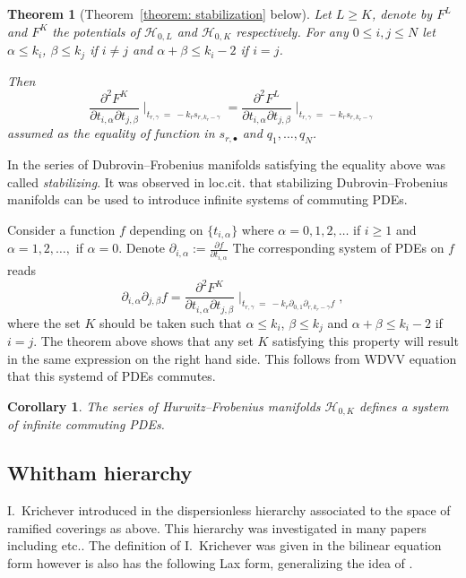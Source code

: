 \documentclass[12pt,a4paper]{amsart}
\def\H{{\mathcal H}}
\newcommand{\p}{{\partial}}
\newcommand{\<}{\left<}
\renewcommand{\>}{\right>}
\newtheorem*{theorem*}{Theorem}
\newtheorem*{corollary*}{Corollary}
\numberwithin{equation}{section}
\begin{document}
\begin{theorem*}[Theorem~\ref{theorem: stabilization} below]
    Let $L \ge K$, denote by $F^L$ and $F^K$ the potentials of $\H_{0,L}$ and $\H_{0,K}$ respectively. For any $0 \le i,j \le N$ let $\alpha \le k_i$, $\beta \le k_j$ if $i \neq j$ and $\alpha+\beta \le k_i-2$ if $i=j$.

    Then
    \[
        \frac{\p^2 F^{K}}{\p t_{i,\alpha} \p t_{j,\beta}} \mid_{t_{r,\gamma} \ = \ - k_r s_{r,k_r-\gamma}}
        =
        \frac{\p^2 F^{L}}{\p t_{i,\alpha} \p t_{j,\beta}} \mid_{t_{r,\gamma} \ = \ - k_r s_{r,k_r-\gamma}}
    \]
    assumed as the equality of function in $s_{r,\bullet}$ and $q_1,\dots,q_N$.
\end{theorem*}
In \cite{BDbN} the series of Dubrovin--Frobenius manifolds satisfying the equality above was called \textit{stabilizing}. It was observed in loc.cit. that stabilizing Dubrovin--Frobenius manifolds can be used to introduce infinite systems of commuting PDEs.

Consider a function $f$ depending on $\lbrace t_{i,\alpha} \rbrace$ where $\alpha = 0,1,2,\dots$  if $i \ge 1$ and $\alpha = 1,2,\dots,$ if $\alpha = 0$. Denote $\p_{i,\alpha} := \frac{\p f}{\p t_{i,\alpha}} $ The corresponding system of PDEs on $f$ reads
\begin{equation}\label{eq: BDbN form}
     \p_{i,\alpha} \p_{j,\beta} f = \frac{\p^2 F^K}{\p t_{i,\alpha} \p t_{j,\beta}} \mid_{t_{r,\gamma} \ = \ -k_r \p_{0,1} \p_{r,k_r-\gamma} f },
\end{equation}
where the set $K$ should be taken such that $\alpha \le k_i$, $\beta \le k_j$ and $\alpha+\beta \le k_i-2$ if $i=j$. The theorem above shows that any set $K$ satisfying this property will result in the same expression on the right hand side. This follows from WDVV equation that this systemd of PDEs commutes.

\begin{corollary*}
    The series of Hurwitz--Frobenius manifolds $\H_{0,K}$ defines a system of infinite commuting PDEs.
\end{corollary*}

\subsection*{Whitham hierarchy}

I.~Krichever introduced in \cite{K94} the dispersionless hierarchy associated to the space of ramified coverings as above. This hierarchy was investigated in many papers including \cite{D2,GMMM,TT07,Za} etc.. The definition of I.~Krichever was given in the bilinear equation form however is also has the following Lax form, generalizing the idea of \cite{DVV}.
\end{document}

